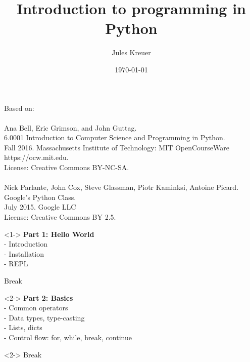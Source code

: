 \documentclass{beamer}
\title[]{Introduction to programming in Python} %
\author{Jules Kreuer} %
\institute[FSI] %
{
Uni Tübingen\\ %
\medskip
\textit{fsi@fsi.uni-tuebingen.de}\\
\textit{contact@juleskreuer.eu}\\
}
\date{\today} %
\begin{document}
\begin{frame}
\titlepage %
\end{frame}


\begin{frame}
	Based on:\\\\
	Ana Bell, Eric Grimson, and John Guttag. \\
	6.0001 Introduction to Computer Science and Programming in Python.\\
	Fall 2016. Massachusetts Institute of Technology: MIT OpenCourseWare\\
	https://ocw.mit.edu.\\
	License: Creative Commons BY-NC-SA.\\\\
	
	Nick Parlante, John Cox, Steve Glassman, Piotr Kaminksi, Antoine Picard.\\
	Google's Python Class.\\
	July 2015. Google LLC\\
	License: Creative Commons BY 2.5.	
\end{frame}

\begin{frame}
	\begin{block}{}<1->
		\textbf{Part 1: Hello World}\\
		- Introduction\\ 
		- Installation \\
		- REPL\\
	\end{block}
	\begin{exampleblock}{}
	Break
	\end{exampleblock}
	\begin{block}{}<2->
	\textbf{\textbf{Part 2:} Basics}\\
	- Common operators\\
	- Data types, type-casting\\
	- Lists, dicts\\
	- Control flow: for, while, break, continue\\
	\end{block}
	\begin{exampleblock}{}<2->
		Break
	\end{exampleblock}
\end{frame}
\end{document}
